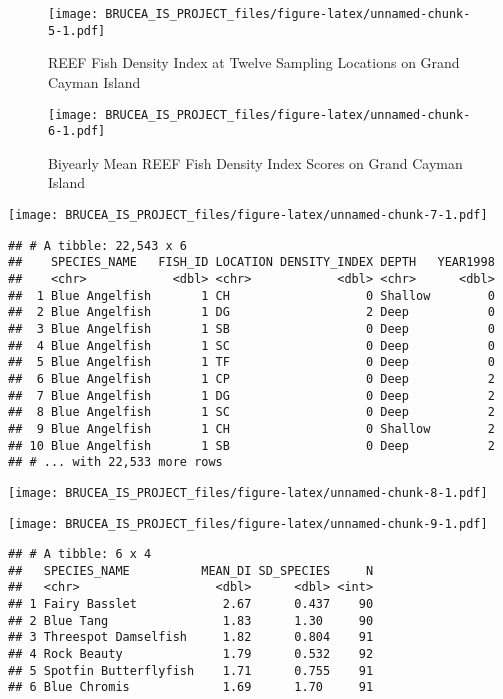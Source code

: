\documentclass[
]{article}
\begin{document}
\begin{figure}
\centering
\texttt{[image: BRUCEA\_IS\_PROJECT\_files/figure-latex/unnamed-chunk-5-1.pdf]}
\caption{REEF Fish Density Index at Twelve Sampling Locations on Grand
Cayman Island}
\end{figure}

\begin{figure}
\centering
\texttt{[image: BRUCEA\_IS\_PROJECT\_files/figure-latex/unnamed-chunk-6-1.pdf]}
\caption{Biyearly Mean REEF Fish Density Index Scores on Grand Cayman
Island}
\end{figure}

\texttt{[image: BRUCEA\_IS\_PROJECT\_files/figure-latex/unnamed-chunk-7-1.pdf]}

\begin{verbatim}
## # A tibble: 22,543 x 6
##    SPECIES_NAME   FISH_ID LOCATION DENSITY_INDEX DEPTH   YEAR1998
##    <chr>            <dbl> <chr>            <dbl> <chr>      <dbl>
##  1 Blue Angelfish       1 CH                   0 Shallow        0
##  2 Blue Angelfish       1 DG                   2 Deep           0
##  3 Blue Angelfish       1 SB                   0 Deep           0
##  4 Blue Angelfish       1 SC                   0 Deep           0
##  5 Blue Angelfish       1 TF                   0 Deep           0
##  6 Blue Angelfish       1 CP                   0 Deep           2
##  7 Blue Angelfish       1 DG                   0 Deep           2
##  8 Blue Angelfish       1 SC                   0 Deep           2
##  9 Blue Angelfish       1 CH                   0 Shallow        2
## 10 Blue Angelfish       1 SB                   0 Deep           2
## # ... with 22,533 more rows
\end{verbatim}

\texttt{[image: BRUCEA\_IS\_PROJECT\_files/figure-latex/unnamed-chunk-8-1.pdf]}

\texttt{[image: BRUCEA\_IS\_PROJECT\_files/figure-latex/unnamed-chunk-9-1.pdf]}

\begin{verbatim}
## # A tibble: 6 x 4
##   SPECIES_NAME          MEAN_DI SD_SPECIES     N
##   <chr>                   <dbl>      <dbl> <int>
## 1 Fairy Basslet            2.67      0.437    90
## 2 Blue Tang                1.83      1.30     90
## 3 Threespot Damselfish     1.82      0.804    91
## 4 Rock Beauty              1.79      0.532    92
## 5 Spotfin Butterflyfish    1.71      0.755    91
## 6 Blue Chromis             1.69      1.70     91
\end{verbatim}
\end{document}
